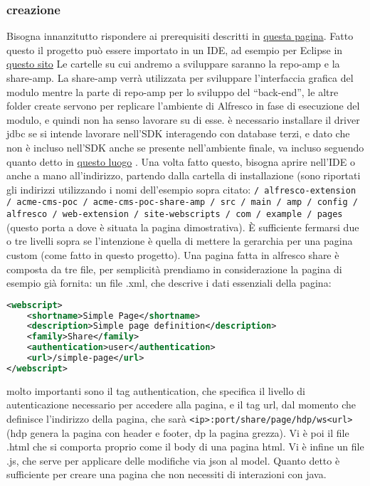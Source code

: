 \subsubsection{creazione}
Bisogna innanzitutto rispondere ai prerequisiti descritti in  \href{http://docs.alfresco.com/sdk2.1/concepts/alfresco-sdk-installing-prerequisite-software.html}{questa pagina}.
Fatto questo il progetto può essere importato in un IDE, ad esempio per Eclipse in \href{http://docs.alfresco.com/community/tasks/alfresco-sdk-rad-eclipse-import-projects.html}{questo sito}
Le cartelle su cui andremo a sviluppare saranno la repo-amp e la share-amp. La share-amp verrà utilizzata per sviluppare l’interfaccia grafica del modulo mentre la parte di repo-amp  per lo sviluppo del “back-end”, le altre folder create servono per replicare l’ambiente di Alfresco in fase di esecuzione del modulo, e quindi non ha senso lavorare su di esse.
è necessario installare il driver jdbc se si intende  lavorare nell’SDK interagendo con database terzi, e dato che non è incluso nell'SDK anche se presente nell'ambiente finale, va incluso seguendo quanto detto in  \href{https://community.alfresco.com/thread/213317-sdk-21-including-third-party-jar-libraries}{questo luogo} . 
Una volta fatto questo, bisogna aprire nell’IDE o anche a mano all’indirizzo, partendo dalla cartella di installazione (sono riportati gli indirizzi utilizzando i nomi dell’esempio sopra citato: \texttt{/ alfresco-extension / acme-cms-poc / acme-cms-poc-share-amp / src / main / amp / config / alfresco / web-extension / site-webscripts / com / example / pages}
 (questo porta a dove è situata la pagina dimostrativa). È sufficiente fermarsi due o tre livelli sopra se l’intenzione è quella di mettere la gerarchia per una pagina custom (come fatto in questo progetto).
Una pagina fatta in alfresco share è composta da tre file, per semplicità prendiamo in considerazione la pagina di esempio già fornita:
un file .xml, che descrive i dati essenziali della pagina:
\begin{lstlisting}[language=XML]
<webscript>
    <shortname>Simple Page</shortname>
    <description>Simple page definition</description>
    <family>Share</family>
    <authentication>user</authentication>
    <url>/simple-page</url>
</webscript>
\end{lstlisting}
molto importanti sono il tag authentication, che specifica il livello di autenticazione necessario per accedere alla pagina, e il tag url, dal momento che definisce l’indirizzo della pagina, che sarà \texttt{<ip>:port/share/page/hdp/ws<url>} (hdp genera la pagina con header e footer, dp la pagina grezza).
Vi è poi il file .html che si comporta proprio come il body di una pagina html.
Vi è infine un file .js, che serve per applicare delle modifiche via json al model.
Quanto detto è sufficiente per creare una pagina che non necessiti di interazioni con java.


